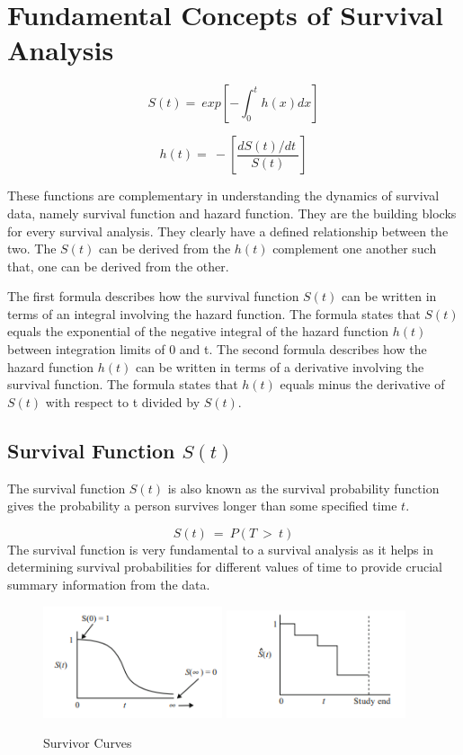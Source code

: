 \documentclass[12pt]{report}
\begin{document}
\section{Fundamental Concepts of Survival Analysis}

\[S\left(t\right)=\ exp\left[-\int_{0}^{t}{h(x)dx}\right]\]

\[h\left(t\right)=\ -\left[\frac{dS\left(t\right)/dt\ }{S(t)}\right]\]

These functions are complementary in understanding the dynamics of survival data, namely survival function and hazard function. They are the building blocks for every survival analysis. They clearly have a defined relationship between the two. The \(S\left(t\right)\) can be derived from the \href{}{\(h\left(t\right) \)} complement one another such that, one can be derived from the other.

The first formula describes how the survival function \(S\left(t\right)\) can be written in terms of an integral involving the hazard function. The formula states that \(S\left(t\right) \)equals the exponential of the negative integral of the hazard function \(h\left(t\right) \) between integration limits of 0 and t. 
The second formula describes how the hazard function \(h\left(t\right) \) can be written in terms of a derivative involving the survival function. The formula states that \( h\left(t\right)\) equals minus the derivative of \(S\left(t\right) \) with respect to t divided by \(S\left(t\right)\).


\subsection{Survival Function \(S(t)\)}
The survival function \(S\left(t\right) \) is also known as the survival probability function gives the probability a person survives longer than some specified time \( t\).

\[S(t)\ =\ P(T\ >\ t)\]
The survival function is very fundamental to a survival analysis as it helps in determining survival probabilities for different values of time  to provide crucial summary information from the data.
\begin{figure}[h]
    \centering
    \includegraphics[width=0.47\textwidth]{Figure 3/3.31.png}
    \hfill
    \includegraphics[width=0.47\textwidth]{Figure 3/3.32.png}
    \caption{Survivor Curves}
    \label{Figure 3.3}
\end{figure}
\end{document}
